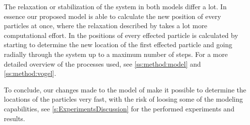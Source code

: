 The relaxation or stabilization of the system in both models differ a lot. In essence our proposed model is able to calculate the new position of every particles at once, where the relaxation described by \citeauthor{vogel2005studies1} takes a lot more computational effort. In \cite{vogel2005studies2} the positions of every effected particle is calculated by starting to determine the new location of the first effected particle and going radially through the system up to a maximum number of steps. For a more detailed overview of the processes used, see \cref{ss:method:model} and \cref{ss:method:vogel}. 

To conclude, our changes made to the model of \cite{vogel2005studies2} make it possible to determine the locations of the particles very fast, with the risk of loosing some of the modeling capabilities, see \cref{s:ExperimentsDiscussion} for the performed experiments and results. 
